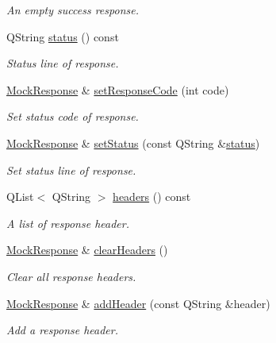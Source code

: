 \begin{DoxyCompactItemize}
\begin{DoxyCompactList}\small\item\em An empty success response. \end{DoxyCompactList}\item 
Q\+String \hyperlink{class_mock_response_a07333f87aae9d9f0ce12dbc3ee8a6c9f}{status} () const 
\begin{DoxyCompactList}\small\item\em Status line of response. \end{DoxyCompactList}\item 
\hyperlink{class_mock_response}{Mock\+Response} \& \hyperlink{class_mock_response_a8a1712c088276f560bc2998c0497cd4e}{set\+Response\+Code} (int code)
\begin{DoxyCompactList}\small\item\em Set status code of response. \end{DoxyCompactList}\item 
\hyperlink{class_mock_response}{Mock\+Response} \& \hyperlink{class_mock_response_a668910be8959fe1d79bc568cad40815b}{set\+Status} (const Q\+String \&\hyperlink{class_mock_response_a07333f87aae9d9f0ce12dbc3ee8a6c9f}{status})
\begin{DoxyCompactList}\small\item\em Set status line of response. \end{DoxyCompactList}\item 
Q\+List$<$ Q\+String $>$ \hyperlink{class_mock_response_a33118ec3775e5ae003a5b05328576f9e}{headers} () const 
\begin{DoxyCompactList}\small\item\em A list of response header. \end{DoxyCompactList}\item 
\hyperlink{class_mock_response}{Mock\+Response} \& \hyperlink{class_mock_response_a1e12972ff518ea9d451803ddc7c2d496}{clear\+Headers} ()
\begin{DoxyCompactList}\small\item\em Clear all response headers. \end{DoxyCompactList}\item 
\hyperlink{class_mock_response}{Mock\+Response} \& \hyperlink{class_mock_response_a6f9646406fc3ddb907c0bda152733350}{add\+Header} (const Q\+String \&header)
\begin{DoxyCompactList}\small\item\em Add a response header. \end{DoxyCompactList}\item 

\end{DoxyCompactItemize}
